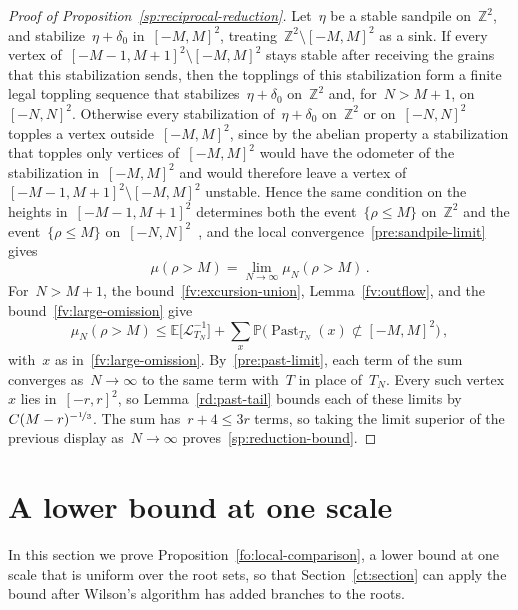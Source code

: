 \documentclass[11pt]{amsart}
\numberwithin{equation}{section}
\newcommand{\Z}{\mathbb Z}
\newcommand{\PP}{\mathbb P}
\newcommand{\EE}{\mathbb E}
\newcommand{\nf}{\nicefrac}
\newcommand{\cL}{\mathscr{L}}
\begin{document}
\begin{proof}[Proof of Proposition~\ref{sp:reciprocal-reduction}]
Let~$\eta$ be a stable sandpile on~$\Z^2$, and stabilize~$\eta+\delta_0$ in~$[-M,M]^2$, treating~$\Z^2\setminus [-M,M]^2$ as a sink. If every vertex of~$[-M-1,M+1]^2\setminus [-M,M]^2$ stays stable after receiving the grains that this stabilization sends, then the topplings of this stabilization form a finite legal toppling sequence that stabilizes~$\eta+\delta_0$ on~$\Z^2$ and, for~$N>M+1$, on~$[-N,N]^2$. Otherwise every stabilization of~$\eta+\delta_0$ on~$\Z^2$ or on~$[-N,N]^2$ topples a vertex outside~$[-M,M]^2$, since by the abelian property a stabilization that topples only vertices of~$[-M,M]^2$ would have the odometer of the stabilization in~$[-M,M]^2$ and would therefore leave a vertex of~$[-M-1,M+1]^2\setminus [-M,M]^2$ unstable. Hence the same condition on the heights in~$[-M-1,M+1]^2$ determines both the event~$\{\rho\leq M\}$ on~$\Z^2$ and the event~$\{\rho\leq M\}$ on~$[-N,N]^2$~\citep*[compare][Remark~1(v)]{AthreyaJarai2004}, and the local convergence~\eqref{pre:sandpile-limit} gives
\begin{equation*}
\mu(\rho>M)=\lim_{N\to\infty}\mu_N(\rho>M)\,.
\end{equation*}
For~$N>M+1$, the bound~\eqref{fv:excursion-union}, Lemma~\ref{fv:outflow}, and the bound~\eqref{fv:large-omission} give
\begin{equation*}
\mu_N(\rho>M)\leq\EE\bigl[\cL_{T_N}^{-1}\bigr]+\sum_x\PP\bigl(\operatorname{Past}_{T_N}(x)\not\subset [-M,M]^2\bigr)\,,
\end{equation*}
with~$x$ as in~\eqref{fv:large-omission}. By~\eqref{pre:past-limit}, each term of the sum converges as~$N\to\infty$ to the same term with~$T$ in place of~$T_N$. Every such vertex~$x$ lies in~$[-r,r]^2$, so Lemma~\ref{rd:past-tail} bounds each of these limits by~$C(M-r)^{-\nf13}$. The sum has~$r+4\leq3r$ terms, so taking the limit superior of the previous display as~$N\to\infty$ proves~\eqref{sp:reduction-bound}.
\end{proof}

\section{A lower bound at one scale}\label{fo:section}

In this section we prove Proposition~\ref{fo:local-comparison}, a lower bound at one scale that is uniform over the root sets, so that Section~\ref{ct:section} can apply the bound after Wilson's algorithm has added branches to the roots.
\end{document}
